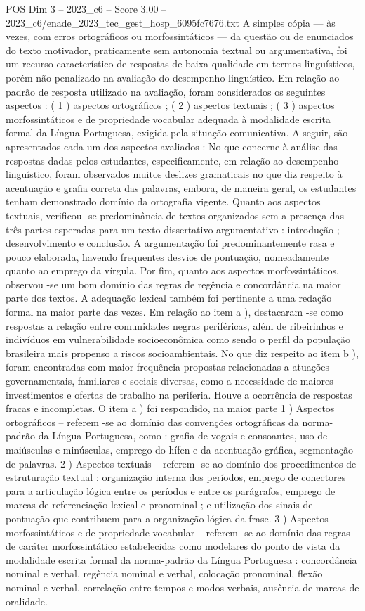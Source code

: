 \begin{textsample}{POS Dim 3 – 2023\_c6 – Score 3.00 – 2023\_c6/enade\_2023\_tec\_gest\_hosp\_6095fc7676.txt}
A simples cópia — às vezes, com erros ortográficos ou morfossintáticos — da questão ou de enunciados do texto motivador, praticamente sem autonomia textual ou argumentativa, foi um recurso característico de respostas de baixa qualidade em termos linguísticos, porém não penalizado na avaliação do desempenho linguístico.
Em relação ao padrão de resposta utilizado na avaliação, foram considerados os seguintes aspectos : ( 1 ) aspectos ortográficos ; ( 2 ) aspectos textuais ; ( 3 ) aspectos morfossintáticos e de propriedade vocabular adequada à modalidade escrita formal da Língua Portuguesa, exigida pela situação comunicativa.
A seguir, são apresentados cada um dos aspectos avaliados : No que concerne à análise das respostas dadas pelos estudantes, especificamente, em relação ao desempenho linguístico, foram observados muitos deslizes gramaticais no que diz respeito à acentuação e grafia correta das palavras, embora, de maneira geral, os estudantes tenham demonstrado domínio da ortografia vigente.
Quanto aos aspectos textuais, verificou -se predominância de textos organizados sem a presença das três partes esperadas para um texto dissertativo-argumentativo : introdução ; desenvolvimento e conclusão.
A argumentação foi predominantemente rasa e pouco elaborada, havendo frequentes desvios de pontuação, nomeadamente quanto ao emprego da vírgula.
Por fim, quanto aos aspectos morfossintáticos, observou -se um bom domínio das regras de regência e concordância na maior parte dos textos.
A adequação lexical também foi pertinente a uma redação formal na maior parte das vezes.
Em relação ao item a ), destacaram -se como respostas a relação entre comunidades negras periféricas, além de ribeirinhos e indivíduos em vulnerabilidade socioeconômica como sendo o perfil da população brasileira mais propenso a riscos socioambientais.
No que diz respeito ao item b ), foram encontradas com maior frequência propostas relacionadas a atuações governamentais, familiares e sociais diversas, como a necessidade de maiores investimentos e ofertas de trabalho na periferia.
Houve a ocorrência de respostas fracas e incompletas.
O item a ) foi respondido, na maior parte 1 ) Aspectos ortográficos – referem -se ao domínio das convenções ortográficas da norma-padrão da Língua Portuguesa, como : grafia de vogais e consoantes, uso de maiúsculas e minúsculas, emprego do hífen e da acentuação gráfica, segmentação de palavras. 2 ) Aspectos textuais – referem -se ao domínio dos procedimentos de estruturação textual : organização interna dos períodos, emprego de conectores para a articulação lógica entre os períodos e entre os parágrafos, emprego de marcas de referenciação lexical e pronominal ; e utilização dos sinais de pontuação que contribuem para a organização lógica da frase. 3 ) Aspectos morfossintáticos e de propriedade vocabular – referem -se ao domínio das regras de caráter morfossintático estabelecidas como modelares do ponto de vista da modalidade escrita formal da norma-padrão da Língua Portuguesa : concordância nominal e verbal, regência nominal e verbal, colocação pronominal, flexão nominal e verbal, correlação entre tempos e modos verbais, ausência de marcas de oralidade.

\end{textsample}
